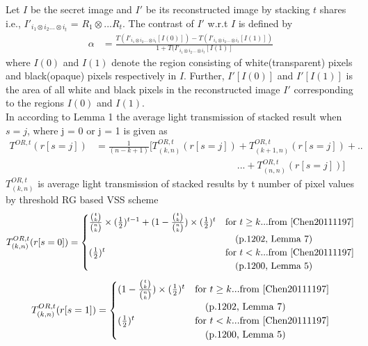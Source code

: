 Let $I$ be the secret image and $I'$ be its reconstructed image by stacking $t$ shares i.e., $I'_{i_1\otimes i_2...\otimes i_t}$ = $R_1\otimes...R_t$. The contrast of $I'$ w.r.t $I$ is defined by \cite{Wu201348}
\begin{align*}
\alpha &= \frac{T(I'_{i_1\otimes i_2...\otimes i_t}[I(0)]) - T(I'_{i_1\otimes i_2...\otimes i_t}[I(1)])}{1 + T(I'_{i_1\otimes i_2...\otimes i_t}[I(1)]}
\end{align*}
where $I(0)$ and $I(1)$ denote the region consisting of white(transparent) pixels and black(opaque) pixels respectively in $I$. Further, $I'[I(0)]$ and $I'[I(1)]$ is the area of all white and black pixels in the reconstructed image $I'$ corresponding to the regions $I(0)$ and $I(1)$.\\
In \cite{Wu201348} according to Lemma 1 the average light transmission of stacked result when $s = j$, where j = 0 or j = 1  is given as 
\begin{align*}
T^{OR,t}(r[s=j]) &=\frac{1}{(n-k+1)} [T^{OR,t}_{(k,n)} (r[s=j]) + T^{OR,t}_{(k+1,n)} (r[s=j]) + ..\\&\phantom{{}=\frac{1}{(n-k+1)} [T^{OR,t}_{(k,n)} (r[s=j])}... + T^{OR,t}_{(n,n)} (r[s=j])]
\end{align*}
$T^{OR,t}_{(k,n)}$ is average light transmission of stacked results by t number of pixel values by \cite{Chen20111197} threshold RG based VSS scheme\\
\begin{gather*}
\begin{align*}
T^{OR,t}_{(k,n)}(r[s=0])=
\begin{cases}
 \frac {\binom tk}{\binom nk} \times (\frac{1}{2})^{t-1} +  (1-  \frac {\binom tk}{\binom nk})\times (\frac{1}{2})^{t} & \text{for } t\geq k  ...\text{from \cite{Chen20111197}}\\& \phantom{{} =} \text{(p.1202, Lemma 7)}\\
(\frac{1}{2})^{t} & \text{for } t<k  ...\text{from \cite{Chen20111197}}\\& \phantom{{} = } \text{(p.1200, Lemma 5)}\\
\end{cases}
\end{align*}
\end{gather*}
\begin{gather*}
\begin{align*}
T^{OR,t}_{(k,n)}(r[s=1])=
\begin{cases}
 (1-  \frac {\binom tk}{\binom nk})\times (\frac{1}{2})^{t} & \text{for } t\geq k  ...\text{from \cite{Chen20111197}}\\& \phantom{{} =} \text{(p.1202, Lemma 7)}\\
(\frac{1}{2})^{t} & \text{for } t<k  ...\text{from \cite{Chen20111197}}\\& \phantom{{} =} \text{(p.1200, Lemma 5)}\\
\end{cases}
\end{align*}
\end{gather*}
